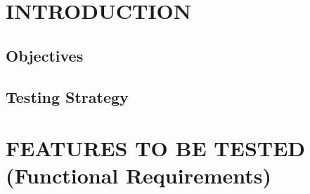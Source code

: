 \documentclass[a4paper,12pt,titlepage,margin=1in]{article}
\begin{document}


\tableofcontents
\newpage

\section{INTRODUCTION}  
	\subsection{Objectives}
		
	\subsection{Testing Strategy}
		
	

	
\section{FEATURES TO BE TESTED (Functional Requirements)}
\end{document}
